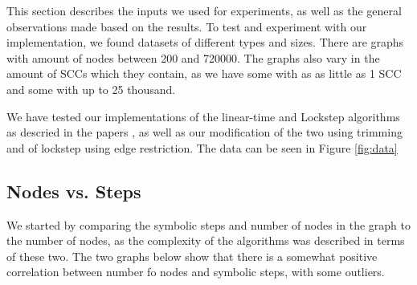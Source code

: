 \documentclass[../master/master.tex]{subfiles}
\begin{document}
This section describes the inputs we used for experiments, as well as the general observations made based on the results. To test and experiment with our implementation, we found datasets of different types and sizes. There are graphs with amount of nodes between 200 and 720000. The graphs also vary in the amount of SCCs which they contain, as we have some with as as little as 1 SCC and some with up to 25 thousand.

We have tested our implementations of the linear-time and Lockstep algorithms as descried in the papers \cite{linear}\cite{lockstep}, as well as our modification of the two using trimming and of lockstep using edge restriction. The data can be seen in Figure \ref{fig:data}
\subsection{Nodes vs. Steps}
We started by comparing the symbolic steps and number of nodes in the graph to the number of nodes, as the complexity of the algorithms was described in terms of these two. The two graphs below show that there is a somewhat positive correlation between number fo nodes and symbolic steps, with some outliers. 
\end{document}
